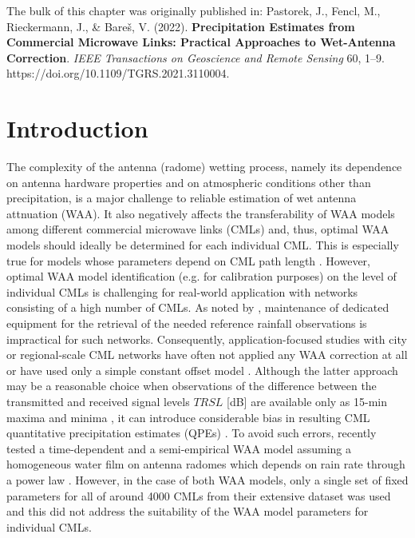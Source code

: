 \documentclass{ctuthesis}\usepackage[]{graphicx}\usepackage[]{color}
\begin{document}
{\footnotesize The bulk of this chapter was originally published in: \newline
\-\hspace{0.5cm}
Pastorek, J., Fencl, M., Rieckermann, J., \& Bareš, V. (2022). \textbf{Precipitation Estimates from Commercial Microwave Links: Practical Approaches to Wet-Antenna Correction}. \emph{IEEE Transactions on Geoscience and Remote Sensing} 60, 1--9. \newline https://doi.org/10.1109/TGRS.2021.3110004.
}

\section{Introduction}

The complexity of the antenna (radome) wetting process, namely its dependence on antenna hardware properties \citep[e.g. coating;][]{lethMeasurementCampaignAssess2018} and on atmospheric conditions other than precipitation, is a major challenge to reliable estimation of wet antenna attnuation (WAA). It also negatively affects the transferability of WAA models among different commercial microwave links (CMLs) and, thus, optimal WAA models should ideally be determined for each individual CML. This is especially true for models whose parameters depend on CML path length \citep[e.g.][]{kharadlyEffectWetAntenna2001}. However, optimal WAA model identification (e.g. for calibration purposes) on the level of individual CMLs is challenging for real-world application with networks consisting of a high number of CMLs. As noted by \cite{ostrometzkyWetAntennaEffectFactor2018}, maintenance of dedicated equipment for the retrieval of the needed reference rainfall observations is impractical for such networks. Consequently, application-focused studies with city or regional-scale CML networks have often not applied any WAA correction at all \citep{chwalaPrecipitationObservationUsing2012, smiatekPotentialCommercialMicrowave2017} or have used only a simple constant offset model \citep{pastorekCommercialMicrowaveLinks2019, overeemMeasuringUrbanRainfall2011, roversiCommercialMicrowaveLinks2020, fenclAtmosphericObservationsEband2020}. Although the latter approach may be a reasonable choice when observations of the difference between the transmitted and received signal levels $T\!R\!S\!L$ [dB] are available only as 15-min maxima and minima  \citep{chwalaCommercialMicrowaveLink2019}, it can introduce considerable bias in resulting CML quantitative precipitation estimates (QPEs) \citep{pastorekCommercialMicrowaveLinks2019, fenclQuantifyingWetAntenna2019}. To avoid such errors, \cite{grafRainfallEstimationGermanwide2020} recently tested a time-dependent \citep{schleissQuantificationModelingWetAntenna2013} and a semi-empirical WAA model assuming a homogeneous water film on antenna radomes which depends on rain rate through a power law \citep{leijnseMicrowaveLinkRainfall2008}. However, in the case of both WAA models, only a single set of fixed parameters for all of around 4000 CMLs from their extensive dataset was used and this did not address the suitability of the WAA model parameters for individual CMLs.
\end{document}
